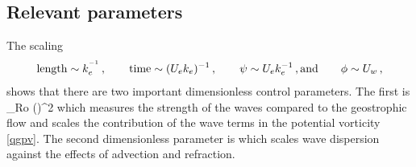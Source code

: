 \documentclass{jfm}
\begin{document}

 \subsection{Relevant parameters}
The scaling
 \begin{align}\label{scaling}
    \text{length}    \sim  k_e^{^{-1}}\, ,\qquad
    \text{time}    \sim (U_e k_e)^{-1}\, ,\qquad
    \psi \sim U_e k_e^{-1} \, ,
    \text{and}\qquad\phi \sim U_w\, ,
 \end{align}
 shows that there are two important dimensionless control parameters. The first is
  \beq
 \label{alpha}
 \alpha {} {}_{ Ro} \times
 {\left(\right)^2}\com
 \eeq
 which measures the strength of the waves compared to the geostrophic flow and scales
 the contribution of the wave terms in the potential vorticity \eqref{qgpv}.
The second dimensionless parameter is
 \beq
 \label{hslash}
 \hslash {} \disp \times {}\com
 \eeq
which  scales wave dispersion against the   effects of advection and refraction.
\end{document}
